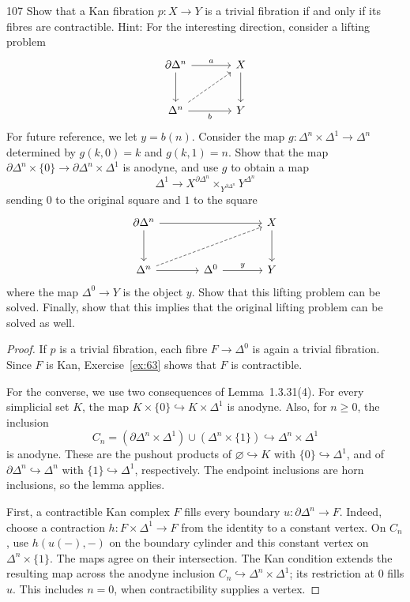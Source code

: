 \begin{exercise}{107}
Show that a Kan fibration $p\colon X\to Y$ is a trivial fibration if and only if its
fibres are contractible. Hint: For the interesting direction, consider a lifting problem
\[
\begin{tikzcd}[column sep=large,row sep=large]
 \partial\Delta^n\arrow[r,"a"]\arrow[d] & X\arrow[d] \\
 \Delta^n\arrow[r,"b"']\arrow[ur,dashed] & Y
\end{tikzcd}
\]
For future reference, we let $y=b(n)$. Consider the map
$g\colon\Delta^n\times\Delta^1\to\Delta^n$ determined by
$g(k,0)=k$ and $g(k,1)=n$. Show that the map
$\partial\Delta^n\times\{0\}\to\partial\Delta^n\times\Delta^1$ is anodyne, and
use $g$ to obtain a map
\[
 \Delta^1\to X^{\partial\Delta^n}\times_{Y^{\partial\Delta^n}}Y^{\Delta^n}
\]
sending $0$ to the original square and $1$ to the square
\[
\begin{tikzcd}[column sep=large,row sep=large]
 \partial\Delta^n\arrow[rr]\arrow[d] & & X\arrow[d] \\
 \Delta^n\arrow[r]\arrow[urr,dashed] & \Delta^0\arrow[r,"y"] & Y
\end{tikzcd}
\]
where the map $\Delta^0\to Y$ is the object $y$. Show that this lifting problem can
be solved. Finally, show that this implies that the original lifting problem can be
solved as well.

\begin{proof}
If $p$ is a trivial fibration, each fibre $F\to\Delta^0$ is again a
trivial fibration. Since $F$ is Kan, Exercise~\ref{ex:63} shows that
$F$ is contractible.

For the converse, we use two consequences of Lemma~1.3.31(4).
For every simplicial set $K$, the map
$K\times\{0\}\hookrightarrow K\times\Delta^1$ is anodyne.
Also, for $n\ge0$, the inclusion
\[
 C_n=(\partial\Delta^n\times\Delta^1)\cup(\Delta^n\times\{1\})
 \hookrightarrow\Delta^n\times\Delta^1
\]
is anodyne. These are the pushout products of
$\varnothing\hookrightarrow K$ with $\{0\}\hookrightarrow\Delta^1$,
and of $\partial\Delta^n\hookrightarrow\Delta^n$ with
$\{1\}\hookrightarrow\Delta^1$, respectively.
The endpoint inclusions are horn inclusions, so the lemma applies.

First, a contractible Kan complex $F$ fills every boundary
$u\colon\partial\Delta^n\to F$.
Indeed, choose a contraction $h\colon F\times\Delta^1\to F$ from
the identity to a constant vertex.
On $C_n$, use $h(u(-),-)$ on the boundary cylinder and this constant
vertex on $\Delta^n\times\{1\}$.
The maps agree on their intersection. The Kan condition extends the
resulting map across the anodyne inclusion $C_n\hookrightarrow
\Delta^n\times\Delta^1$; its restriction at $0$ fills $u$.
This includes $n=0$, when contractibility supplies a vertex.


\end{proof}
\end{exercise}
